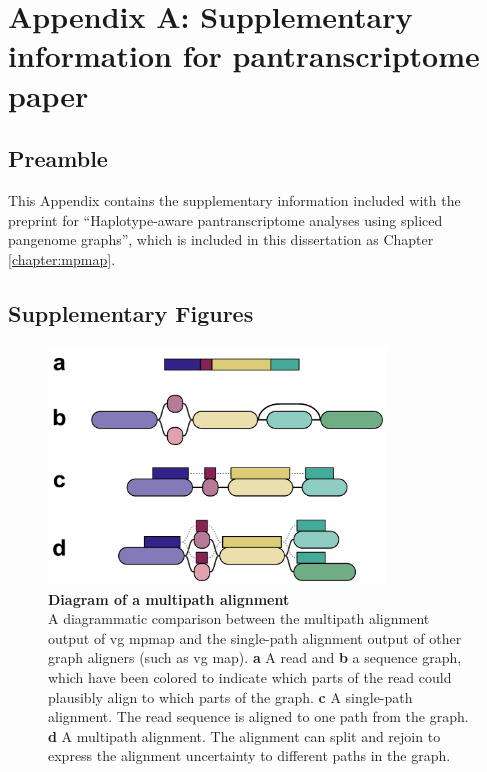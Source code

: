 \documentclass[11pt]{ucthesis}
\begin{document}
\chapter{Appendix A: Supplementary information for pantranscriptome paper}

\section{Preamble}

This Appendix contains the supplementary information included with the preprint for ``Haplotype-aware pantranscriptome analyses using spliced pangenome graphs'', which is included in this dissertation as Chapter \ref{chapter:mpmap}.

\section{Supplementary Figures}

\begin{figure}[H]
\ssp
\begin{center}
\includegraphics[width=0.8\textwidth]{mpmapfigures/figureS10.pdf}
\caption{\textbf{Diagram of a multipath alignment} \\
A diagrammatic comparison between the multipath alignment output of vg mpmap and the single-path alignment output of other graph aligners (such as vg map). \textbf{a} A read and \textbf{b} a sequence graph, which have been colored to indicate which parts of the read could plausibly align to which parts of the graph. \textbf{c} A single-path alignment. The read sequence is aligned to one path from the graph. \textbf{d} A multipath alignment. The alignment can split and rejoin to express the alignment uncertainty to different paths in the graph.
} \label{fig:multipath-alignment}
\end{center}
\end{figure}
\end{document}
